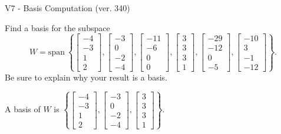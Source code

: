 \begin{exercise}
  \begin{exerciseTitle}V7 - Basis Computation (ver. 340)\end{exerciseTitle}
  \begin{exerciseStatement}
    Find a basis for the subspace 
\[W=\mathrm{span}\ \left\{\left[\begin{array}{r}
-4 \\
-3 \\
1 \\
2
\end{array}\right] , \left[\begin{array}{r}
-3 \\
0 \\
-2 \\
-4
\end{array}\right] , \left[\begin{array}{r}
-11 \\
-6 \\
0 \\
0
\end{array}\right] , \left[\begin{array}{r}
3 \\
3 \\
3 \\
1
\end{array}\right] , \left[\begin{array}{r}
-29 \\
-12 \\
0 \\
-5
\end{array}\right] , \left[\begin{array}{r}
-10 \\
3 \\
-1 \\
-12
\end{array}\right]\right\}.\]
 Be sure to explain why your result is a basis.


  \end{exerciseStatement}
  \begin{exerciseAnswer}
   A basis of \(W\) is  \(\left\{\left[\begin{array}{r}
-4 \\
-3 \\
1 \\
2
\end{array}\right] , \left[\begin{array}{r}
-3 \\
0 \\
-2 \\
-4
\end{array}\right] , \left[\begin{array}{r}
3 \\
3 \\
3 \\
1
\end{array}\right]\right\}\).
  


  \end{exerciseAnswer}
\end{exercise}